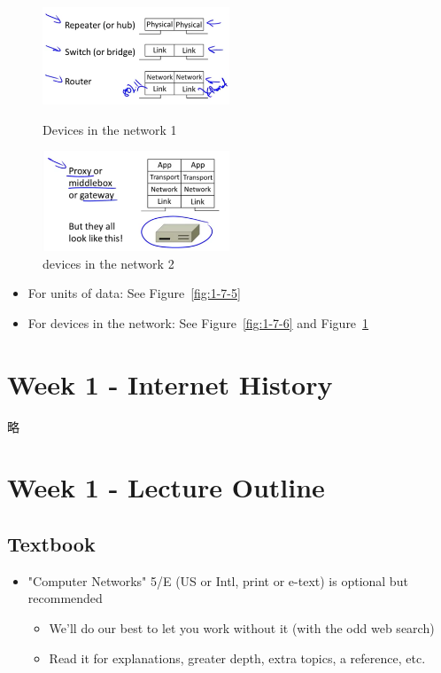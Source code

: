 \documentclass[12pt]{ctexart}   %
\begin{document}
	\begin{figure}
		\begin{minipage}[t]{0.5\linewidth}
			\centering
			\includegraphics[width=2.2in]{images/1-7-6}
			\caption{Devices in the network  1}
			\label{fig:1-7-6}
		\end{minipage}
		\begin{minipage}[t]{0.5\linewidth}
			\centering
			\includegraphics[width=2.2in]{images/1-7-7}
			\caption{devices in the network 2}
			\label{fig:1-7-7}
		\end{minipage}
	\end{figure}
	 
	 \begin{itemize}
	 	\item For units of data: See Figure~\ref{fig:1-7-5}
	 	
	 	\item For devices in the network: See Figure~\ref{fig:1-7-6} and Figure~\ref{fig:1-7-7}
	 \end{itemize}
	 
\section{Week 1 - Internet History}	
	略
\section{Week 1 - Lecture Outline}
	\subsection{Textbook}
	\begin{itemize}
		\item "Computer Networks" 5/E (US or Intl, print or e-text) is optional but recommended
		\begin{itemize}
			\item We'll do our best to let you work without it (with the odd web search)
			\item Read it for explanations, greater depth, extra topics, a reference, etc.
		\end{itemize}
	\end{itemize}
	
\end{document}
